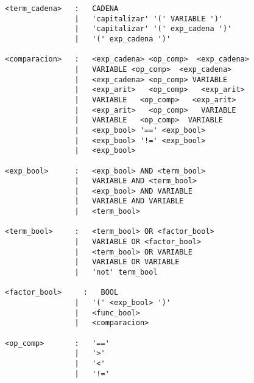 \begin{verbatim}
<term_cadena>   :   CADENA
                |   'capitalizar' '(' VARIABLE ')'
                |   'capitalizar' '(' exp_cadena ')'
                |   '(' exp_cadena ')'

<comparacion>   :   <exp_cadena> <op_comp>  <exp_cadena>
                |   VARIABLE <op_comp>  <exp_cadena>
                |   <exp_cadena> <op_comp> VARIABLE 
                |   <exp_arit>   <op_comp>   <exp_arit>
                |   VARIABLE   <op_comp>   <exp_arit>
                |   <exp_arit>   <op_comp>   VARIABLE
                |   VARIABLE   <op_comp>  VARIABLE 
                |   <exp_bool> '==' <exp_bool>
                |   <exp_bool> '!=' <exp_bool>
                |   <exp_bool>

<exp_bool>      :   <exp_bool> AND <term_bool>
                |   VARIABLE AND <term_bool>
                |   <exp_bool> AND VARIABLE
                |   VARIABLE AND VARIABLE
                |   <term_bool>

<term_bool>     :   <term_bool> OR <factor_bool>
                |   VARIABLE OR <factor_bool>
                |   <term_bool> OR VARIABLE
                |   VARIABLE OR VARIABLE
                |   'not' term_bool

<factor_bool>     :   BOOL
                |   '(' <exp_bool> ')'
                |   <func_bool>
                |   <comparacion>

<op_comp>       :   '=='
                |   '>'
                |   '<'
                |   '!='


    
\end{verbatim}
